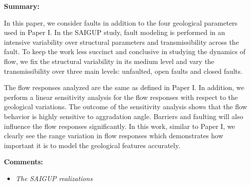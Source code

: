 {%
\textbf{Summary:} 

In this paper, we consider faults in addition to the four geological parameters
used in Paper I. In the SAIGUP study, fault modeling is performed in an
intensive variability over structural parameters and transmissibility across the
fault. To keep the work less succinct and conclusive in studying the
dynamics of flow, we fix the structural variability in its medium level and vary
the transmissibility over three main levels: unfaulted, open faults and closed
faults.

The flow responses analyzed are the same as
  defined in Paper I. In addition, we perform a linear sensitivity analysis for
the flow responses
with respect to the geological variations. The outcome of the sensitivity analysis
shows that the flow behavior is highly sensitive to aggradation angle. Barriers
and faulting will also influence the flow responses significantly. In this
work, similar to Paper I, we clearly see the range variation in
flow responses which demonstrates how important it is to model the geological
features accurately. 

\vspace{0.5cm}
\noindent\textbf{Comments:} 

\begin{itemize}

\item \textit{The SAIGUP realizations}
 
% 


\end{itemize}}
